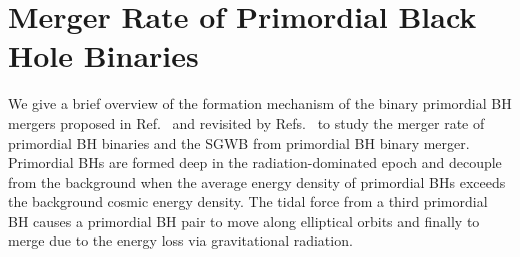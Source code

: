 \section{Merger Rate of Primordial Black Hole Binaries} 

We give a brief overview of the formation mechanism of the binary primordial \ac{BH} mergers proposed in Ref.~\cite{Nakamura:1997sm} and revisited by Refs.~\cite{Ioka:1998nz,Sasaki:2016jop} to study the merger rate of primordial \ac{BH} binaries and the \ac{SGWB} from primordial \ac{BH} binary merger. 
Primordial \acp{BH} are formed deep in the radiation-dominated epoch and decouple from the background when the average energy density of primordial \acp{BH} exceeds the background cosmic energy density.
The tidal force from a third primordial \ac{BH} causes a primordial \ac{BH} pair to move along elliptical orbits and finally to merge due to the energy loss via gravitational radiation.

